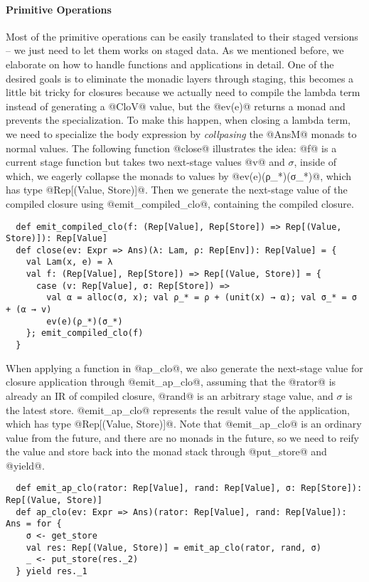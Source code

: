 \paragraph{Primitive Operations} Most of the primitive operations can be easily
translated to their staged versions -- we just need to let them works on staged data.
As we mentioned before, we elaborate on how to handle functions and applications in
detail. One of the desired goals is to eliminate the monadic layers through
staging, this becomes a little bit tricky for closures because we actually need 
 to compile the lambda term instead of generating a @CloV@ value, but the @ev(e)@
returns a monad and prevents the specialization. To make this happen, when
closing a lambda term, we need to specialize the body expression by
\textit{collpasing} the @AnsM@ monads to normal values. The
following function @close@ illustrates the idea: @f@ is a current stage function
but takes two next-stage values @v@ and $\sigma$, inside of which, we eagerly
collapse the monads to values by @ev(e)(ρ_*)(σ_*)@, which has type
@Rep[(Value, Store)]@. Then we generate the next-stage value of the compiled
closure using @emit_compiled_clo@, containing the compiled closure.

\begin{lstlisting}
  def emit_compiled_clo(f: (Rep[Value], Rep[Store]) => Rep[(Value, Store)]): Rep[Value]
  def close(ev: Expr => Ans)(λ: Lam, ρ: Rep[Env]): Rep[Value] = {
    val Lam(x, e) = λ
    val f: (Rep[Value], Rep[Store]) => Rep[(Value, Store)] = {
      case (v: Rep[Value], σ: Rep[Store]) =>
        val α = alloc(σ, x); val ρ_* = ρ + (unit(x) → α); val σ_* = σ + (α → v)
        ev(e)(ρ_*)(σ_*)
    }; emit_compiled_clo(f)
  }
\end{lstlisting}

When applying a function in @ap_clo@, we also generate the next-stage value
for closure application through @emit_ap_clo@, assuming that the @rator@ is already an
IR of compiled closure, @rand@ is an arbitrary stage value, and $\sigma$ is the
latest store. @emit_ap_clo@ represents the result value of the application, which has type
@Rep[(Value, Store)]@. Note that @emit_ap_clo@ is an ordinary value from the
future, and there are no monads in the future, so we need to reify the value and
store back into the monad stack through @put_store@ and @yield@.

\begin{lstlisting}
  def emit_ap_clo(rator: Rep[Value], rand: Rep[Value], σ: Rep[Store]): Rep[(Value, Store)]
  def ap_clo(ev: Expr => Ans)(rator: Rep[Value], rand: Rep[Value]): Ans = for {
    σ <- get_store
    val res: Rep[(Value, Store)] = emit_ap_clo(rator, rand, σ)
    _ <- put_store(res._2)
  } yield res._1
\end{lstlisting}

